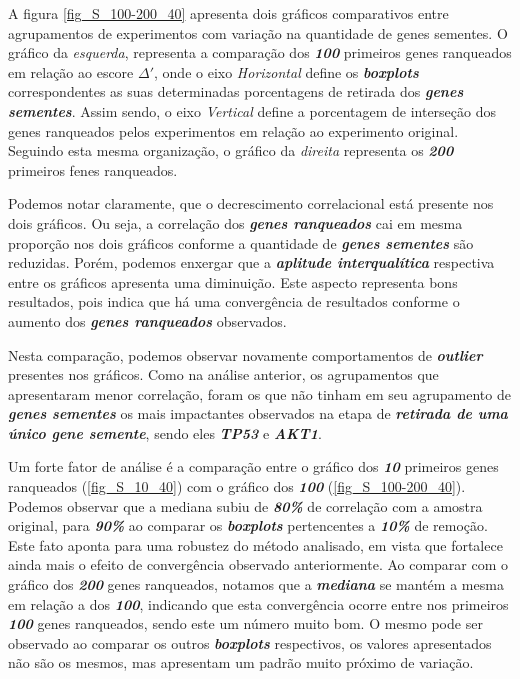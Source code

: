 A figura \ref{fig_S_100-200_40} apresenta dois gráficos comparativos entre agrupamentos de experimentos com variação na quantidade de genes sementes. O gráfico da \textsl{esquerda}, representa a comparação dos \textsl{\textbf{100}} primeiros genes ranqueados em relação ao escore \textsl{\textbf{$\Delta'$}}, onde o eixo \textsl{Horizontal} define os \textsl{\textbf{boxplots}} correspondentes as suas determinadas porcentagens de retirada dos \textsl{\textbf{genes sementes}}. Assim sendo, o eixo \textsl{Vertical} define a porcentagem de interseção dos genes ranqueados pelos experimentos em relação ao experimento original.
Seguindo esta mesma organização, o gráfico da \textsl{direita} representa os \textsl{\textbf{200}} primeiros fenes ranqueados.
%

Podemos notar claramente, que o decrescimento correlacional está presente nos dois gráficos. Ou seja, a correlação dos \textsl{\textbf{genes ranqueados}} cai em mesma proporção nos dois gráficos conforme a quantidade de \textsl{\textbf{genes sementes}} são reduzidas. Porém, podemos enxergar que a \textsl{\textbf{aplitude interqualítica}} respectiva entre os gráficos apresenta uma diminuição. Este aspecto representa bons resultados, pois indica que há uma convergência de resultados conforme o aumento dos \textsl{\textbf{genes ranqueados}} observados.
%

Nesta comparação, podemos observar novamente comportamentos de \textsl{\textbf{outlier}} presentes nos gráficos. Como na análise anterior, os agrupamentos que apresentaram menor correlação, foram os que não tinham em seu agrupamento de \textsl{\textbf{genes sementes}} os mais impactantes observados na etapa de \textsl{\textbf{retirada de uma único gene semente}}, sendo eles \textsl{\textbf{TP53}} e \textsl{\textbf{AKT1}}.
%

Um forte fator de análise é a comparação entre o gráfico dos \textsl{\textbf{10}} primeiros genes ranqueados (\ref{fig_S_10_40}) com o gráfico dos \textsl{\textbf{100}} (\ref{fig_S_100-200_40}). Podemos observar que a mediana subiu de \textsl{\textbf{80\%}} de correlação com a amostra original, para \textsl{\textbf{90\%}} ao comparar os \textsl{\textbf{boxplots}} pertencentes a \textsl{\textbf{10\%}} de remoção. Este fato aponta para uma robustez do método analisado, em vista que fortalece ainda mais o efeito de convergência observado anteriormente. Ao comparar com o gráfico dos \textsl{\textbf{200}} genes ranqueados, notamos que a \textsl{\textbf{mediana}} se mantém a mesma em relação a dos \textsl{\textbf{100}}, indicando que esta convergência ocorre entre nos primeiros \textsl{\textbf{100}} genes ranqueados, sendo este um número muito bom. O mesmo pode ser observado ao comparar os outros \textsl{\textbf{boxplots}} respectivos, os valores apresentados não são os mesmos, mas apresentam um padrão muito próximo de variação.



